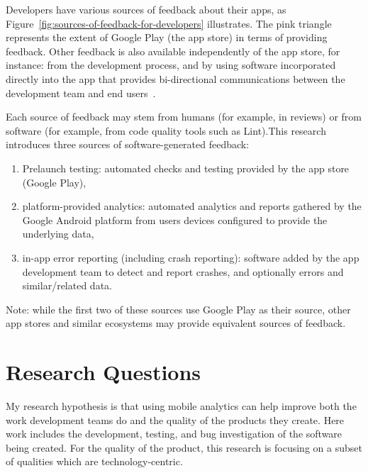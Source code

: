 Developers have various sources of feedback about their apps, as Figure~\ref{fig:sources-of-feedback-for-developers} illustrates. The pink triangle represents the extent of Google Play (the app store) in terms of providing feedback. Other feedback is also available independently of the app store, for instance: from the development process, and by using software incorporated directly into the app that provides bi-directional communications between the development team and end users~\citep{avellis_harty_yu_towards_mobile_twin_peaks}.

\pagebreak

Each source of feedback may stem from humans (for example, in reviews) or from software (for example, from code quality tools such as Lint).This research introduces three sources of software-generated feedback:
\begin{enumerate}
    \itemsep0em 
    \item Prelaunch testing: automated checks and testing provided by the app store (Google Play),
    \item platform-provided analytics: automated analytics and reports gathered by the Google Android platform from users devices configured to provide the underlying data,
    \item in-app error reporting (including crash reporting): software added by the app development team to detect and report crashes, and optionally errors and similar/related data.
\end{enumerate}


Note: while the first two of these sources use Google Play as their source, other app stores and similar ecosystems may provide equivalent sources of feedback.

\clearpage
\section{Research Questions}
\label{section-research-questions}

My research hypothesis is that using mobile analytics can help improve both the work development teams do and the quality of the products they create. Here work includes the development, testing, and bug investigation of the software being created. For the quality of the product, this research is focusing on a subset of qualities which are technology-centric.

